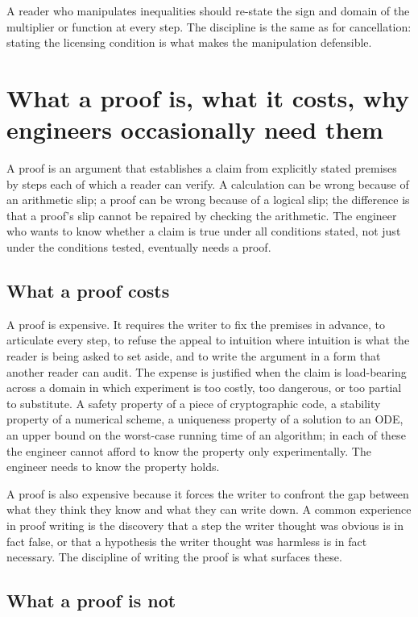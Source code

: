 A reader who manipulates inequalities should re-state the sign and
domain of the multiplier or function at every step. The discipline
is the same as for cancellation: stating the licensing condition is
what makes the manipulation defensible.

\section{What a proof is, what it costs, why engineers occasionally
need them}

A proof is an argument that establishes a claim from explicitly
stated premises by steps each of which a reader can verify. A
calculation can be wrong because of an arithmetic slip; a proof can
be wrong because of a logical slip; the difference is that a proof's
slip cannot be repaired by checking the arithmetic. The engineer who
wants to know whether a claim is true under all conditions stated,
not just under the conditions tested, eventually needs a proof.

\subsection{What a proof costs}

A proof is expensive. It requires the writer to fix the premises in
advance, to articulate every step, to refuse the appeal to intuition
where intuition is what the reader is being asked to set aside, and
to write the argument in a form that another reader can audit. The
expense is justified when the claim is load-bearing across a domain
in which experiment is too costly, too dangerous, or too partial to
substitute. A safety property of a piece of cryptographic code, a
stability property of a numerical scheme, a uniqueness property of
a solution to an ODE, an upper bound on the worst-case running time
of an algorithm; in each of these the engineer cannot afford to know
the property only experimentally. The engineer needs to know the
property holds.

A proof is also expensive because it forces the writer to confront
the gap between what they think they know and what they can write
down. A common experience in proof writing is the discovery that a
step the writer thought was obvious is in fact false, or that a
hypothesis the writer thought was harmless is in fact necessary. The
discipline of writing the proof is what surfaces these.

\subsection{What a proof is not}

